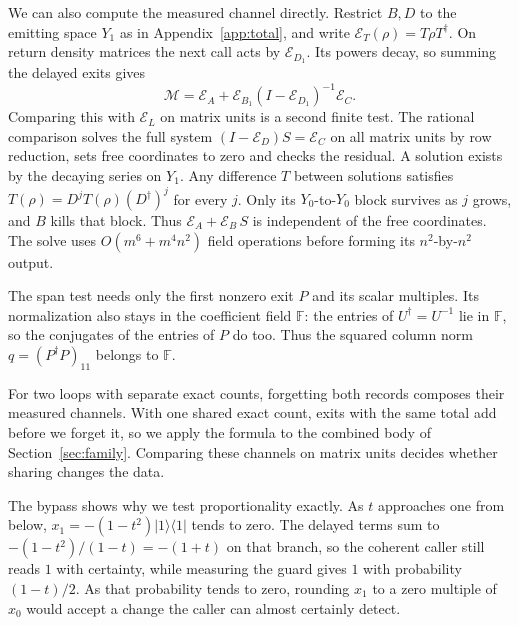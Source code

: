\documentclass[acmsmall,screen,review,anonymous,nonacm]{acmart}
\newcommand{\ket}[1]{\lvert #1\rangle}
\newcommand{\bra}[1]{\langle #1\rvert}
\numberwithin{equation}{section}
\newcommand{\chan}[1]{\mathcal E_{#1}}
\newcommand{\meas}{\mathcal M}
\begin{document}
We can also compute the measured channel directly. Restrict $B,D$ to the
emitting space $Y_1$ as in Appendix~\ref{app:total}, and write
$\chan T(\rho)=T\rho T^\dagger$. On return density matrices the next call
acts by $\chan{D_1}$. Its powers decay, so summing the delayed exits gives
\[
 \meas=\chan A+\chan{B_1}(I-\chan{D_1})^{-1}\chan C .
\]
Comparing this with $\chan L$ on matrix units is a second finite test.
The rational comparison solves the full system
$(I-\chan D)S=\chan C$ on all matrix units by row reduction, sets free
coordinates to zero and checks the residual. A solution exists by the decaying
series on $Y_1$. Any difference $T$ between solutions satisfies
$T(\rho)=D^jT(\rho)(D^\dagger)^j$ for every $j$. Only its $Y_0$-to-$Y_0$
block survives as $j$ grows, and $B$ kills that block. Thus
$\chan A+\chan B\,S$ is independent of the free coordinates. The solve uses
$O(m^6+m^4n^2)$ field operations before forming its $n^2$-by-$n^2$ output.

The span test needs only the first nonzero exit $P$ and its scalar multiples.
Its normalization also stays in the coefficient field $\mathbb F$: the entries
of $U^\dagger=U^{-1}$ lie in $\mathbb F$, so the conjugates of the entries of
$P$ do too. Thus the squared column norm $q=(P^\dagger P)_{11}$ belongs to
$\mathbb F$.

For two loops with separate exact counts, forgetting both records
composes their measured channels. With one shared exact count, exits
with the same total add before we forget it, so we apply the formula to
the combined body of Section~\ref{sec:family}. Comparing these channels
on matrix units decides whether sharing changes the data.

The bypass shows why we test proportionality exactly.
As $t$ approaches one from below, $x_1=-(1-t^2)\ket1\bra1$ tends to zero.
The delayed terms sum to $-(1-t^2)/(1-t)=-(1+t)$ on that branch,
so the coherent caller still reads $1$ with certainty, while measuring
the guard gives $1$ with probability $(1-t)/2$. As that probability tends
to zero, rounding $x_1$ to a zero multiple of $x_0$ would accept a change
the caller can almost certainly detect.
\end{document}
